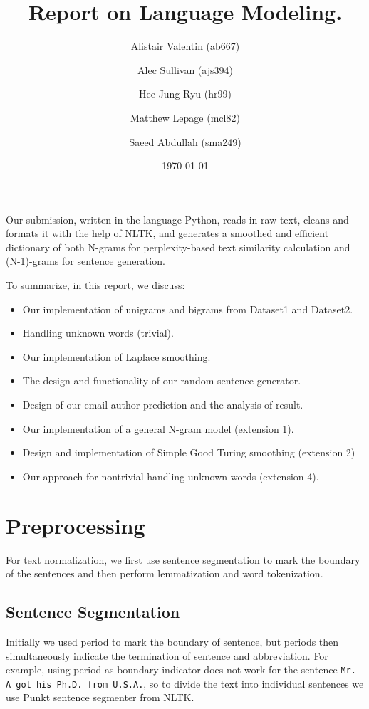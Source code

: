 \documentclass[12pt]{article}
\title{Report on Language Modeling.}
\author{Alistair Valentin (ab667)\\
\and Alec Sullivan (ajs394)\\
\and Hee Jung Ryu (hr99)\\
\and Matthew Lepage (mcl82)\\
\and Saeed Abdullah (sma249)}
\date \today
\begin{document}
\maketitle

Our submission, written in the language Python, reads in raw text, cleans and formats it with the help of NLTK, and generates a smoothed and efficient dictionary of both N-grams for perplexity-based text similarity calculation and (N-1)-grams for sentence generation.

To summarize, in this report, we discuss:
\begin{itemize}
\item Our implementation of unigrams and bigrams from Dataset1 and Dataset2.
\item Handling unknown words (trivial).
\item Our implementation of Laplace smoothing.
\item The design and functionality of our random sentence generator.
\item Design of our email author prediction and the analysis of result.
\item Our implementation of a general N-gram model (extension 1).
\item Design and implementation of Simple Good Turing smoothing (extension 2)
\item Our approach for nontrivial handling unknown words (extension 4).
\end{itemize}
\section{Preprocessing}

For text normalization, we first use sentence segmentation to mark the boundary
of the sentences and then perform lemmatization and word tokenization.



\subsection{Sentence Segmentation}
Initially we used period to mark the boundary of sentence, but periods then
simultaneously indicate the termination of sentence and abbreviation. For
example, using period as boundary indicator does not work for 
the sentence \texttt{Mr. A got his Ph.D. from U.S.A.}, so to divide the
text into individual sentences we use Punkt sentence segmenter
\cite{kiss2006unsupervised} from NLTK.
\end{document}
